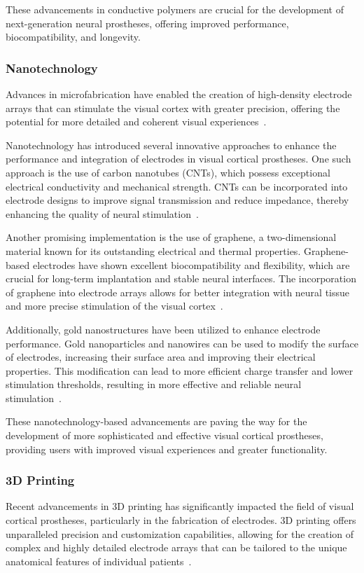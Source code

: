 \documentclass[twocolumn,10pt]{article}
\begin{document}
These advancements in conductive polymers are crucial for the development of
next-generation neural prostheses, offering improved performance,
biocompatibility, and longevity.

\subsubsection*{Nanotechnology}
Advances in microfabrication have enabled the creation of high-density electrode
arrays that can stimulate the visual cortex with greater precision, offering the
potential for more detailed and coherent visual
experiences~\parencite{ryuSpatiallyConfinedResponses2020}.

Nanotechnology has introduced several innovative approaches to enhance the
performance and integration of electrodes in visual cortical prostheses. One
such approach is the use of carbon nanotubes (CNTs), which possess exceptional
electrical conductivity and mechanical strength. CNTs can be incorporated into
electrode designs to improve signal transmission and reduce impedance, thereby
enhancing the quality of neural
stimulation~\parencite{alegretThreeDimensionalConductiveScaffolds2018}.

Another promising implementation is the use of graphene, a two-dimensional
material known for its outstanding electrical and thermal properties.
Graphene-based electrodes have shown excellent biocompatibility and flexibility,
which are crucial for long-term implantation and stable neural interfaces. The
incorporation of graphene into electrode arrays allows for better integration
with neural tissue and more precise stimulation of the visual
cortex~\parencite{luGraphenebasedNeurotechnologiesAdvanced2018}.

Additionally, gold nanostructures have been utilized to enhance electrode
performance. Gold nanoparticles and nanowires can be used to modify the surface
of electrodes, increasing their surface area and improving their electrical
properties. This modification can lead to more efficient charge transfer and
lower stimulation thresholds, resulting in more effective and reliable neural
stimulation~\parencite{zareGoldNanostructuresSynthesis2022}.

These nanotechnology-based advancements are paving the way for the development
of more sophisticated and effective visual cortical prostheses, providing users
with improved visual experiences and greater functionality.

\subsubsection*{3D Printing}
Recent advancements in 3D printing has significantly impacted the field of
visual cortical prostheses, particularly in the fabrication of electrodes. 3D
printing offers unparalleled precision and customization capabilities, allowing
for the creation of complex and highly detailed electrode arrays that can be
tailored to the unique anatomical features of individual
patients~\parencite{guoImplantableLiquidMetalbased2017}.
\end{document}
